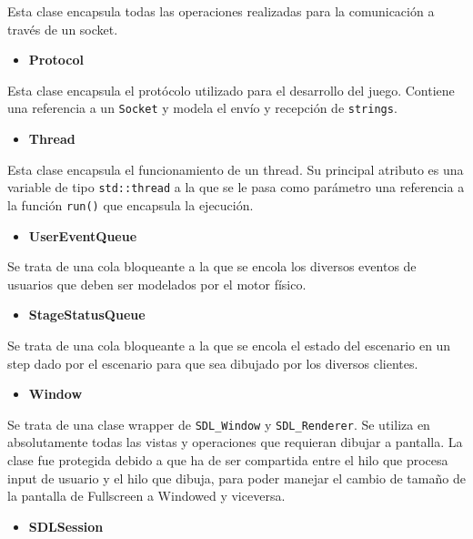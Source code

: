 \documentclass[a4paper]{article}
\begin{document}
Esta clase encapsula todas las operaciones realizadas para la comunicación a través de un socket.

\begin{itemize}
	\item \textbf{Protocol}
\end{itemize}

Esta clase encapsula el protócolo utilizado para el desarrollo del juego. Contiene una referencia a un \texttt{Socket} y modela el envío y recepción de \texttt{strings}.

\begin{itemize}
	\item \textbf{Thread}
\end{itemize}

Esta clase encapsula el funcionamiento de un thread. Su principal atributo es una variable de tipo \texttt{std::thread} a la que se le pasa como parámetro una
referencia a la función \texttt{run()} que encapsula la ejecución.

\begin{itemize}
	\item \textbf{UserEventQueue}
\end{itemize}

Se trata de una cola bloqueante a la que se encola los diversos eventos de usuarios que deben ser modelados por el motor físico.

\begin{itemize}
	\item \textbf{StageStatusQueue}
\end{itemize}

Se trata de una cola bloqueante a la que se encola el estado del escenario en un step dado por el escenario para que sea dibujado por los diversos clientes.

\begin{itemize}
	\item \textbf{Window}
\end{itemize}

Se trata de una clase wrapper de \texttt{SDL\_Window} y \texttt{SDL\_Renderer}. Se utiliza en absolutamente todas las vistas y operaciones que requieran dibujar a pantalla.
La clase fue protegida debido a que ha de ser compartida entre el hilo que procesa input de usuario y el hilo que dibuja, para poder manejar el cambio de tamaño de la pantalla de Fullscreen a Windowed y viceversa.

\begin{itemize}
	\item \textbf{SDLSession}
\end{itemize}
\end{document}
